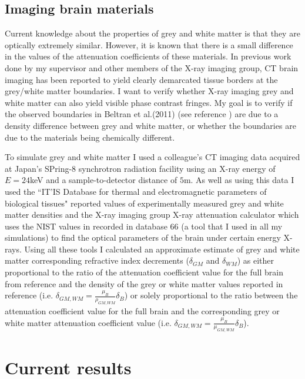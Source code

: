 \documentclass[9pt, a4paper]{article}
\begin{document}
\subsection{Imaging brain materials}
Current knowledge about the properties of grey and white matter is that they are optically extremely similar. However, it is known that there is a small difference in the values of the attenuation coefficients of these materials. In previous work done by my supervisor and other members of the X-ray imaging group, CT brain imaging has been reported to yield clearly demarcated tissue borders at the grey/white matter boundaries\cite{Beltran2}. I want to verify whether X-ray imaging grey and white matter can also yield visible phase contrast fringes. My goal is to verify if the observed boundaries in Beltran et al.(2011) (see reference \cite{Beltran2}) are due to a density difference between grey and white matter, or whether the boundaries are due to the materials being chemically different.

To simulate grey and white matter I used a colleague's CT imaging data acquired at Japan's SPring-8 synchrotron radiation facility using an X-ray energy of $E = 24$keV and a sample-to-detector distance of $5$m\cite{Linda}. As well as using this data I used the ``IT’IS Database for thermal and electromagnetic parameters of biological tissues" reported values of experimentally measured grey and white matter densities and the X-ray imaging group X-ray attenuation calculator which uses the NIST values in recorded in database 66\cite{NIST} (a tool that I used in all my simulations) to find the optical parameters of the brain under certain energy X-rays. Using all these tools I calculated an approximate estimate of grey and white matter corresponding refractive index decrements ($\delta_{GM}$ and $\delta_{WM}$) as either proportional to the ratio of the attenuation coefficient value for the full brain from reference\cite{NIST} and the density of the grey or white matter values reported in reference \cite{ITIS} (i.e. $\delta_{GM,WM} = \frac{\mu_B}{\rho_{GM,WM}} \delta_B$) or solely proportional to the ratio between the attenuation coefficient value for the full brain and the corresponding grey or white matter attenuation coefficient value (i.e. $\delta_{GM,WM} = \frac{\mu_B}{\mu_{GM,WM}} \delta_B$). 

\section{Current results}
\end{document}
